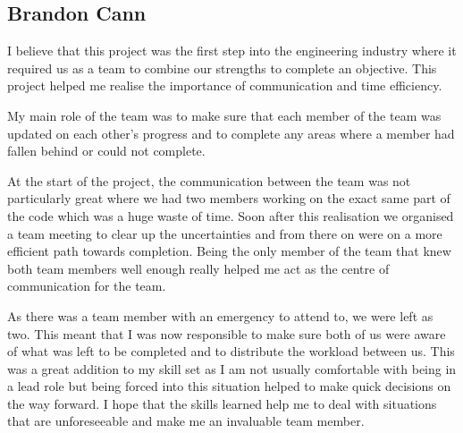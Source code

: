\documentclass[12pt,a4paper]{article}
\begin{document}
\subsection{Brandon Cann}
I believe that this project was the first step into the engineering industry where it required us as a team to combine our 
strengths to complete an objective. This project helped me realise the importance of communication and time efficiency. 
\par
My main role of the team was to make sure that each member of the team was updated on each other’s progress and to complete 
any areas where a member had fallen behind or could not complete. 
\par
At the start of the project, the communication between the team was not particularly great where we had two members working 
on the exact same part of the code which was a huge waste of time. Soon after this realisation we organised a team meeting 
to clear up the uncertainties and from there on were on a more efficient path towards completion. Being the only member of 
the team that knew both team members well enough really helped me act as the centre of communication for the team. 
\par
As there was a team member with an emergency to attend to, we were left as two. This meant that I was now responsible to 
make sure both of us were aware of what was left to be completed and to distribute the workload between us. This was a great 
addition to my skill set as I am not usually comfortable with being in a lead role but being forced into this situation 
helped to make quick decisions on the way forward. I hope that the skills learned help me to deal with situations that are 
unforeseeable and make me an invaluable team member. 
\end{document}
